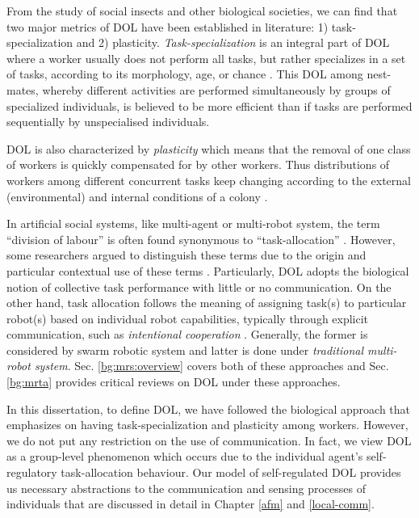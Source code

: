 From the study of social insects and other biological societies, we can find that two major metrics of DOL have been established in literature: 1) task-specialization and 2) plasticity. {\em Task-specialization} is an integral part of DOL where a worker usually does not perform all tasks, but rather specializes in a set of tasks, according to its morphology, age, or chance \cite{Bonabeau+1999}. This DOL among nest-mates, whereby different activities are performed simultaneously by groups of specialized individuals, is believed to be more efficient than if tasks are performed sequentially by unspecialised individuals.

DOL is also characterized by {\em plasticity} which means that the removal of one class of workers is quickly compensated for by other workers. Thus distributions of workers among different concurrent tasks keep changing according to the external (environmental) and internal conditions of a colony \cite{Garnier+2007}.

In artificial social systems, like multi-agent or multi-robot system, the term ``division of labour'' is often found synonymous to ``task-allocation'' \cite{Shen+2001}. However, some researchers  argued to distinguish these terms due to the origin and particular contextual use of these terms \cite{Labella2007}. Particularly, DOL adopts the biological notion of collective task performance with little or no communication. On the other hand, task allocation follows the meaning of assigning task(s) to particular robot(s) based on individual robot capabilities, typically through explicit communication, such as {\em intentional cooperation} \cite{Parker1998}. Generally, the former is considered by swarm robotic system and latter is done under {\em traditional multi-robot system}. Sec. \ref{bg:mrs:overview} covers both of these approaches and Sec. \ref{bg:mrta} provides critical reviews on DOL under these approaches.

In this dissertation, to define DOL, we have followed the biological approach that emphasizes on having task-specialization and plasticity among workers. However, we do not put any restriction on the use of communication. In fact, we view DOL as a group-level phenomenon which occurs due to the individual agent's self-regulatory task-allocation behaviour. Our model of self-regulated DOL provides us necessary abstractions to the communication and sensing processes of individuals that are discussed in detail in Chapter \ref{afm} and \ref{local-comm}. 
